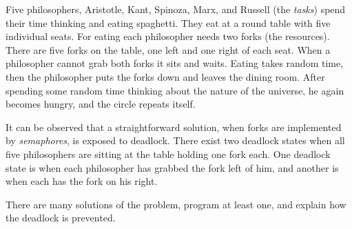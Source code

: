 Five philosophers, Aristotle, Kant, Spinoza, Marx, and Russell (the
\emph{tasks}) spend their time thinking and eating spaghetti. They eat
at a round table with five individual seats. For eating each
philosopher needs two forks (the resources). There are five forks on
the table, one left and one right of each seat. When a philosopher
cannot grab both forks it sits and waits. Eating takes random time,
then the philosopher puts the forks down and leaves the dining room.
After spending some random time thinking about the nature of the
universe, he again becomes hungry, and the circle repeats itself.

It can be observed that a straightforward solution, when forks are
implemented by \emph{semaphores}, is exposed to deadlock. There exist
two deadlock states when all five philosophers are sitting at the
table holding one fork each. One deadlock state is when each
philosopher has grabbed the fork left of him, and another is when each
has the fork on his right.

There are many solutions of the problem, program at least one, and
explain how the deadlock is prevented.


